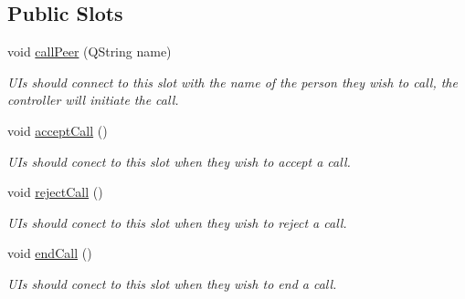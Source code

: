 \subsection*{\-Public \-Slots}
\begin{DoxyCompactItemize}
\item 
void \hyperlink{class_state_controller_ac2d1ccb2bab7565fee787a87580cdb83}{call\-Peer} (\-Q\-String name)
\begin{DoxyCompactList}\small\item\em \-U\-Is should connect to this slot with the name of the person they wish to call, the controller will initiate the call. \end{DoxyCompactList}\item 
void \hyperlink{class_state_controller_a7ae34b3ab2c5189c2e216ef78fae6a7e}{accept\-Call} ()
\begin{DoxyCompactList}\small\item\em \-U\-Is should conect to this slot when they wish to accept a call. \end{DoxyCompactList}\item 
void \hyperlink{class_state_controller_a0898c62cc514101cda35ee08618368b8}{reject\-Call} ()
\begin{DoxyCompactList}\small\item\em \-U\-Is should conect to this slot when they wish to reject a call. \end{DoxyCompactList}\item 
void \hyperlink{class_state_controller_aa82e7568aed9fc5d1e13f7ed94535abf}{end\-Call} ()
\begin{DoxyCompactList}\small\item\em \-U\-Is should conect to this slot when they wish to end a call. \end{DoxyCompactList}\end{DoxyCompactItemize}
